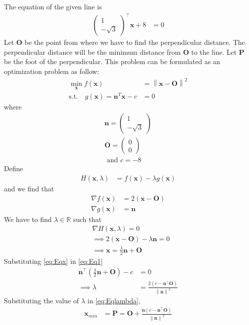 \documentclass[12pt]{article}
\providecommand{\brak}[1]{\ensuremath{\left(#1\right)}}
\providecommand{\norm}[1]{\left\lVert#1\right\rVert}
\newcommand{\myvec}[1]{\ensuremath{\begin{pmatrix}#1\end{pmatrix}}}
\let\vec\mathbf
\begin{document}
\begin{enumerate}
The equation of the given line is 
\begin{align}
	\label{eq:Eq1}
	\myvec{1 \\ -\sqrt{3}}^\top\vec{x}+8 &= 0
\end{align}
Let $\vec{O}$ be the point from where we have to find the perpendicular distance. The perpendicular distance will be the minimum distance from $\vec{O}$ to the line. Let $\vec{P}$ be the foot of the perpendicular. This problem can be formulated as an optimization problem as follow:
\begin{align}
	\label{eq:Eq3}
	\min_{\vec{x}} f\brak{\vec{x}} &= \norm{\vec{x}-\vec{O}}^2\\
	\text{s.t.} \quad g\brak{\vec{x}} = \vec{n}^T\vec{x}-c &= 0 
\end{align}
where
\begin{align}
	\vec{n} = \myvec{1 \\ -\sqrt{3}} \\
	\vec{O} = \myvec{0 \\ 0} \\
	\text{ and } c = -8
\end{align}
Define
\begin{align}
	H\brak{\vec{x}, \lambda} &= f\brak{\vec{x}} - \lambda g\brak{\vec{x}} 
\end{align}
and we find that 
\begin{align}
	\nabla f\brak{\vec{x}} &= 2\brak{\vec{x}-\vec{O}} \\
        \nabla g\brak{\vec{x}} &= \vec{n}
\end{align}
We have to find $\lambda \in \mathbb{R}$ such that
\begin{align}
	&\nabla H\brak{\vec{x},\lambda} = 0 \\
        \label{eq:Eqlambda}
	&\implies 2\brak{\vec{x}-\vec{O}} - \lambda\vec{n} = 0 \\
        \label{eq:Eqx}
	&\implies \vec{x} = \frac{\lambda}{2}\vec{n} + \vec{O} 
\end{align}
Substituting \eqref{eq:Eqx} in \eqref{eq:Eq1}
\begin{align}
	\vec{n}^\top\brak{\frac{\lambda}{2}\vec{n} + \vec{O}}-c &= 0 \\
	\implies \lambda &= \frac{2\brak{c-\vec{n}^\top\vec{O}}}{\norm{\vec{n}}^2}
\end{align}
Substituting the value of $\lambda$ in \eqref{eq:Eqlambda}, 
\begin{align}
	\vec{x}_{min} &= \vec{P} = \vec{O}+ \frac{\vec{n}\brak{c-\vec{n}^\top\vec{O}}}{\norm{\vec{n}}^2}\\

\end{align}
\end{enumerate}
\end{document}
